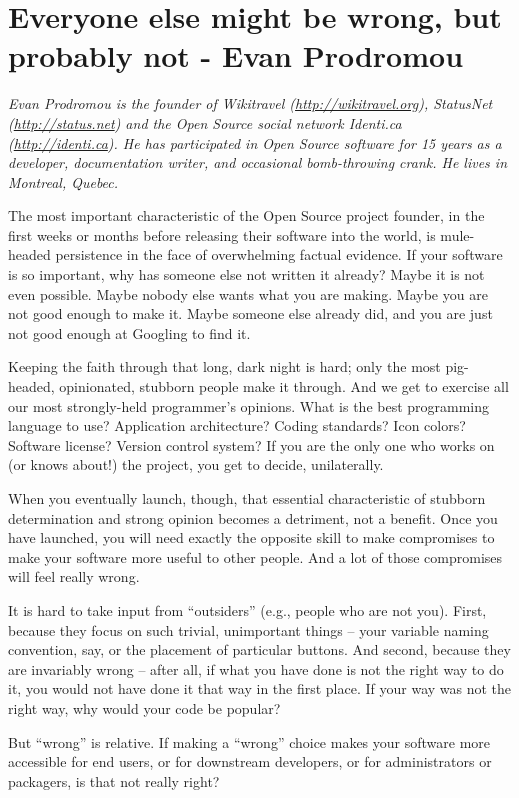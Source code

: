 \chapter{Everyone else might be wrong, but probably not - Evan Prodromou}

\textit{Evan Prodromou is the founder of Wikitravel (\url{http://wikitravel.org}),
StatusNet (\url{http://status.net}) and the Open Source social network Identi.ca
(\url{http://identi.ca}). He has participated in Open Source software for 15 years as a
developer, documentation writer, and occasional bomb-throwing crank. He lives in
Montreal, Quebec.}

The most important characteristic of the Open Source project founder, in the
first weeks or months before releasing their software into the world, is
mule-headed persistence in the face of overwhelming factual evidence. If your
software is so important, why has someone else not written it already? Maybe it is
not even possible. Maybe nobody else wants what you are making. Maybe you are not
good enough to make it. Maybe someone else already did, and you are just not good
enough at Googling to find it.

Keeping the faith through that long, dark night is hard; only the most
pig-headed, opinionated, stubborn people make it through. And we get to exercise
all our most strongly-held programmer's opinions. What is the best programming
language to use? Application architecture? Coding standards? Icon colors?
Software license? Version control system? If you are the only one who works on
(or knows about!) the project, you get to decide, unilaterally.

When you eventually launch, though, that essential characteristic of stubborn
determination and strong opinion becomes a detriment, not a benefit. Once you have
launched, you will need exactly the opposite skill to make compromises to make
your software more useful to other people. And a lot of those compromises will
feel really wrong.

It is hard to take input from ``outsiders'' (e.g., people who are not you). First,
because they focus on such trivial, unimportant things -- your variable naming
convention, say, or the placement of particular buttons. And second, because
they are invariably wrong -- after all, if what you have done is not the right way to
do it, you would not have done it that way in the first place. If your way was not
the right way, why would your code be popular?

But ``wrong'' is relative. If making a ``wrong'' choice makes your software more
accessible for end users, or for downstream developers, or for administrators or
packagers, is that not really right?

